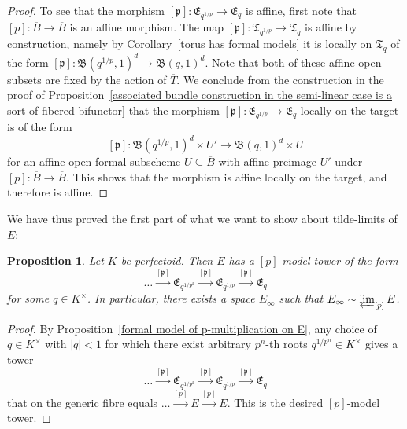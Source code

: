 \documentclass[11pt,oneside]{amsart}
\newtheorem{proposition}[theorem]{Proposition}
\theoremstyle{definition}
\theoremstyle{remark}
\begin{document}
\begin{proof}
		To see that the morphism $[\mathfrak p]:\mathfrak E_{q^{1/p}} \rightarrow  \mathfrak E_{q}$ is affine, first note that $[p]:\overline{B}\rightarrow \overline{B}$ is an affine morphism. The map $[\mathfrak p]:\mathfrak T_{q^{1/p}}\rightarrow \mathfrak T_{q}$ is affine by construction, namely by Corollary~\ref{torus has formal models} it is locally on $\mathfrak T_{q}$ of the form $[\mathfrak p]:\mathfrak B(q^{1/p},1)^d\rightarrow \mathfrak B(q,1)^d$. Note that both of these affine open subsets are fixed by the action of $\overline{T}$.
		We conclude from the construction in the proof of Proposition~\ref{associated bundle construction in the semi-linear case is a sort of fibered bifunctor} that the morphism  $[\mathfrak p]:\mathfrak E_{q^{1/p}} \rightarrow  \mathfrak E_{q}$ locally on the target is of the form
		\[[\mathfrak p]:\mathfrak B(q^{1/p},1)^d \times U' \rightarrow \mathfrak B(q,1)^d \times U\]
		for an affine open formal subscheme $U\subseteq \overline{B}$ with affine preimage $U'$ under $[p]:\overline{B}\rightarrow \overline{B}$. This shows that the morphism is affine locally on the target, and therefore is affine.
	\end{proof}
	
	We have thus proved the first part of what we want to show about tilde-limits of $E$:
	\begin{proposition}\label{p-model tower exists for E}
		Let $K$ be perfectoid. Then $E$ has a $[p]$-model tower of the form
		\[\dots \xrightarrow{[\mathfrak p]} \mathfrak E_{q^{1/p^2}}\xrightarrow{[\mathfrak p]} \mathfrak E_{q^{1/p}}\xrightarrow{[\mathfrak p]} \mathfrak E_q\]
		for some $q\in K^\times$. In particular, there exists a space $E_\infty$ such that $E_\infty\sim \varprojlim_{[p]}E$.
	\end{proposition}
	\begin{proof}
		By Proposition~\ref{formal model of p-multiplication on E}, any choice of $q\in K^\times$ with $|q|<1$ for which there exist arbitrary $p^n$-th roots $q^{1/p^n}\in K^\times$ gives a tower
		\[\dots \xrightarrow{[\mathfrak p]} \mathfrak E_{q^{1/p^2}}\xrightarrow{[\mathfrak p]} \mathfrak E_{q^{1/p}}\xrightarrow{[\mathfrak p]} \mathfrak E_q\]
		that on the generic fibre equals $\dots\xrightarrow{[p]} E\xrightarrow{[p]} E$. This is the desired $[p]$-model tower.
	\end{proof}
	
\end{document}
